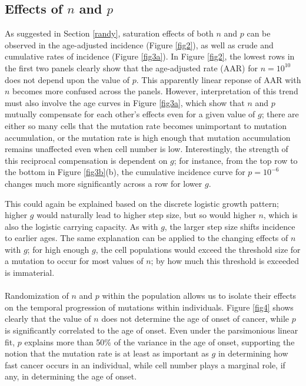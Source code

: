 \documentclass[12pt, onecolumn]{article}
\begin{document}
	\subsection{Effects of $n$ and $p$}
	As suggested in Section \ref{randy}, saturation effects of both $n$ and $p$ can be observed in the age-adjusted incidence (Figure \ref{fig2}), as well as crude and cumulative rates of incidence (Figure \ref{fig3a}). In Figure \ref{fig2}, the lowest rows in the first two panels clearly show that the age-adjusted rate (AAR) for $n=10^{10}$ does not depend upon the value of $p$. This apparently linear reponse of AAR with $n$ becomes more confused across the panels. However, interpretation of this trend must also involve the age curves in Figure \ref{fig3a}, which show that $n$ and $p$ mutually compensate for each  other's effects even for a given value of $g$; there are either so many cells that the mutation rate becomes unimportant to mutation accumulation, or the mutation rate is high enough that mutation accumulation remains unaffected even when cell number is low. Interestingly, the strength of this reciprocal compensation is dependent on $g$; for instance, from the top row to the bottom in Figure \ref{fig3b}(b), the cumulative incidence curve for $p=10^{-6}$ changes much more significantly across a row for lower $g$.
	
	This could again be explained based on the discrete logistic growth pattern; higher $g$ would naturally lead to higher step size, but so would higher $n$, which is also the logistic carrying capacity. As with $g$, the larger step size shifts incidence to earlier ages. The same explanation can be applied to the changing effects of $n$ with $g$; for high enough $g$, the cell populations would exceed the threshold size for a mutation to occur for most values of $n$; by how much this threshold is exceeded is immaterial.
	
	\paragraph{\empty}Randomization of $n$ and $p$ within the population allows us to isolate their effects on the temporal progression of mutations within individuals. Figure \ref{fig4} shows clearly that the value of $n$ does not determine the age of onset of cancer, while $p$ is significantly correlated to the age of onset. Even under the parsimonious linear fit, $p$ explains more than 50\% of the variance in the age of onset, supporting the notion that the mutation rate is at least as important as $g$ in determining how fast cancer occurs in an individual, while cell number plays a marginal role, if any, in determining the age of onset.
	
\end{document}
